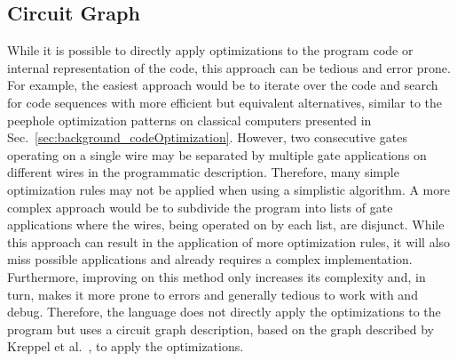 \subsection{Circuit Graph}
\label{sec:concept_circuitGraph}
While it is possible to directly apply optimizations to the program code or internal representation of the code, this approach can be tedious and error prone. For example, the easiest approach would be to iterate over the code and search for code sequences with more efficient but equivalent alternatives, similar to the peephole optimization patterns on classical computers presented in Sec.~\ref{sec:background_codeOptimization}. However, two consecutive gates operating on a single wire may be separated by multiple gate applications on different wires in the programmatic description. 
Therefore, many simple optimization rules may not be applied when using a simplistic algorithm. A more complex approach would be to subdivide the program into lists of gate applications where the wires, being operated on by each list, are disjunct. While this approach can result in the application of more optimization rules, it will also miss possible applications and already requires a complex implementation. Furthermore, improving on this method only increases its complexity and, in turn, makes it more prone to errors and generally tedious to work with and debug. Therefore, the language does not directly apply the optimizations to the program but uses a circuit graph description, based on the graph described by Kreppel et al.~\cite{KMO*23}, to apply the optimizations.

